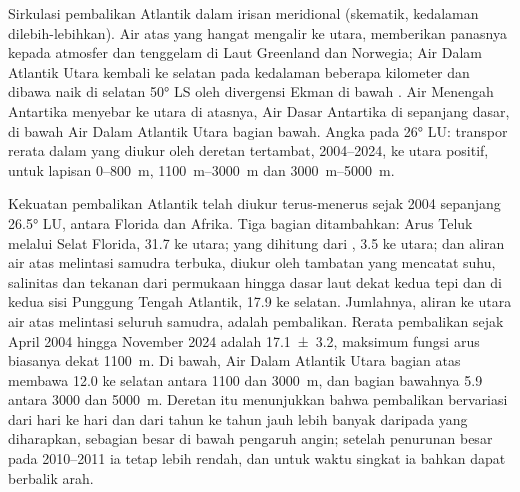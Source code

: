 \begin{omfigure}
{\small Sirkulasi pembalikan Atlantik dalam irisan meridional (skematik, kedalaman dilebih-lebihkan). Air atas yang hangat mengalir ke utara, memberikan panasnya kepada atmosfer dan tenggelam di Laut Greenland dan Norwegia; Air Dalam Atlantik Utara kembali ke selatan pada kedalaman beberapa kilometer dan dibawa naik di selatan \ang{50} LS oleh divergensi Ekman di bawah . Air Menengah Antartika menyebar ke utara di atasnya, Air Dasar Antartika di sepanjang dasar, di bawah Air Dalam Atlantik Utara bagian bawah. Angka pada \ang{26} LU: transpor rerata dalam  yang diukur oleh deretan tertambat, 2004--2024, ke utara positif, untuk lapisan 0--\qty{800}{m}, \qtyrange{1100}{3000}{m} dan \qtyrange{3000}{5000}{m}.}
\label{fig:b1:ocean-circulation:moc}
\end{omfigure}

Kekuatan pembalikan Atlantik telah diukur terus-menerus sejak 2004 sepanjang \ang{26.5} LU, antara Florida dan Afrika. Tiga bagian ditambahkan: Arus Teluk melalui Selat Florida, \qty{31.7}{\sverdrup} ke utara;  yang dihitung dari , \qty{3.5}{\sverdrup} ke utara; dan aliran air atas melintasi samudra terbuka, diukur oleh tambatan yang mencatat suhu, salinitas dan tekanan dari permukaan hingga dasar laut dekat kedua tepi dan di kedua sisi Punggung Tengah Atlantik, \qty{17.9}{\sverdrup} ke selatan. Jumlahnya, aliran ke utara air atas melintasi seluruh samudra, adalah pembalikan.
Rerata pembalikan sejak April 2004 hingga November 2024 adalah \qty[uncertainty-mode=separate]{17.1 \pm 3.2}{\sverdrup}, maksimum fungsi arus biasanya dekat \qty{1100}{m}. Di bawah, Air Dalam Atlantik Utara bagian atas membawa \qty{12.0}{\sverdrup} ke selatan antara 1100 dan \qty{3000}{m}, dan bagian bawahnya \qty{5.9}{\sverdrup} antara 3000 dan \qty{5000}{m}. Deretan itu menunjukkan bahwa pembalikan bervariasi dari hari ke hari dan dari tahun ke tahun jauh lebih banyak daripada yang diharapkan, sebagian besar di bawah pengaruh angin; setelah penurunan besar pada 2010--2011 ia tetap lebih rendah, dan untuk waktu singkat ia bahkan dapat berbalik arah.

